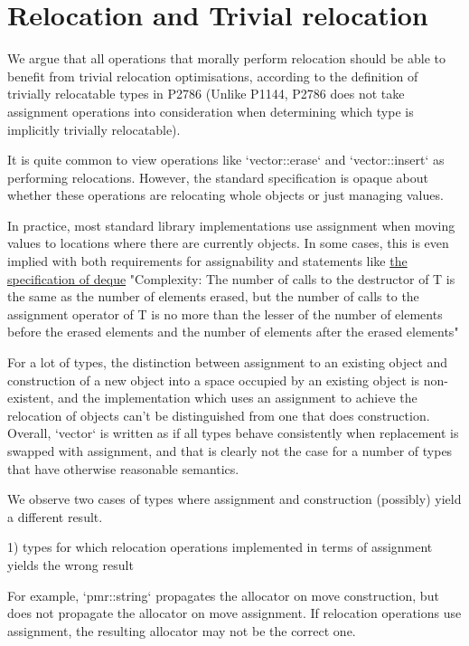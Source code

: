 \documentclass{wg21}
\begin{document}
\section{Relocation and Trivial relocation}

We argue that all operations that morally perform relocation should be able to benefit from trivial relocation optimisations, according to the definition of trivially relocatable types in P2786 (Unlike P1144, P2786 does not take assignment operations into consideration when determining which type is implicitly trivially relocatable).

It is quite common to view operations like `vector::erase` and `vector::insert` as performing relocations. However, the standard specification is opaque about whether these operations are relocating whole objects or just managing values.

In practice, most standard library implementations use assignment when moving values to locations where there are currently objects.  In some cases, this is even implied with both requirements for assignability and statements like
\href{https://eel.is/c++draft/sequences#deque.modifiers-6}{the specification of deque}
"Complexity: The number of calls to the destructor of T is the same as the number of elements erased, but the number of calls to the assignment operator of T is no more than the lesser of the number of elements before the erased elements and the number of elements after the erased elements"


For a lot of types, the distinction between assignment to an existing object and construction of a new object into a space occupied by an existing object is non-existent, and the implementation which uses an assignment to achieve the relocation of objects can't be distinguished from one that does construction.
Overall, `vector` is written as if all types behave consistently when replacement is swapped with assignment, and that is clearly not the case for a number of types that have otherwise reasonable semantics.

We observe two cases of types where assignment and construction (possibly) yield a different result.

1) types for which relocation operations implemented in terms of assignment yields the wrong result

For example, `pmr::string` propagates the allocator on move construction, but does not propagate the allocator on move assignment. If relocation operations use assignment, the resulting allocator may not be the correct one.
\end{document}
